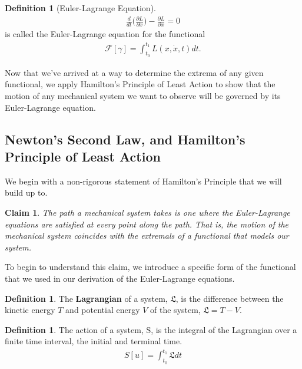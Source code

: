 \documentclass[10pt, psamsfonts]{amsart}
\newtheorem{claim}[thm]{Claim}
\theoremstyle{definition}
\newtheorem{defn}[thm]{Definition}
\theoremstyle{remark}
\numberwithin{equation}{section}
\begin{document}
\begin{defn}[Euler-Lagrange Equation]
\begin{align*}
  \frac{d}{dt} \bigg(\frac{\partial L}{\partial \dot{x}}  \bigg) - \frac{\partial L}{\partial x} = 0 
\end{align*}
is called the Euler-Lagrange equation for the functional 
\begin{align*}
    \mathcal{F}[\gamma] = \int_{t_0}^{t_1}L(x, \dot{x}, t)dt.
\end{align*}
\end{defn}

Now that we've arrived at a way to determine the extrema of any given functional, we apply Hamilton's Principle of Least Action to show that the motion of any mechanical system we want to observe will be governed by its Euler-Lagrange equation.

\subsection{Newton's Second Law, and Hamilton's Principle of Least Action}
We begin with a non-rigorous statement of Hamilton's Principle that we will build up to.
\begin{claim}
The path a mechanical system takes is one where the Euler-Lagrange equations are satisfied at every point along the path. That is, the motion of the mechanical system coincides with the extremals of a functional that models our system.
\end{claim}

\noindent To begin to understand this claim, we introduce a specific form of the functional that we used in our derivation of the Euler-Lagrange equations.

\begin{defn}
The \textbf{Lagrangian} of a system, $\mathfrak{L}$, is the difference between the kinetic energy $T$ and potential energy $V$ of the system, $\mathfrak{L} = T - V$.
\end{defn}
\begin{defn}
The action of a system, S, is the integral of the Lagrangian over a finite time interval, the initial and terminal time.
\begin{align*}
  S[u] = \int_{t_0}^{t_1} \mathfrak{L}dt  
\end{align*}
\end{defn}
\end{document}
